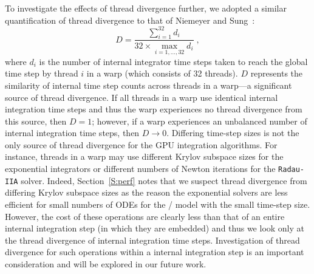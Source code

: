 \documentclass[preprint]{elsarticle}
\begin{document}
To investigate the effects of thread divergence further, we adopted a similar quantification of thread divergence to that of Niemeyer and Sung~\cite{Niemeyer:2014aa}:
\begin{equation}
	D = \frac{\sum_{i=1}^{32}{d_i}}{32 \times \max\limits_{i = 1, \dots, 32} d_i} \;,
	\label{eqn:divergence}
\end{equation}
where $d_i$ is the number of internal integrator time steps taken to reach the global time step by thread $i$ in a warp (which consists of 32 threads).
$D$ represents the similarity of internal time step counts across threads in a warp---a significant source of thread divergence.
If all threads in a warp use identical internal integration time steps and thus the warp experiences no thread divergence from this source, then $D = 1$; however, if a warp experiences an unbalanced number of internal integration time steps, then $D \to 0$.
Differing time-step sizes is not the only source of thread divergence for the GPU integration algorithms.
For instance, threads in a warp may use different Krylov subspace sizes for the exponential integrators or different numbers of Newton iterations for the \texttt{Radau-IIA} solver.
Indeed, Section~\ref{S:perf} notes that we suspect thread divergence from differing Krylov subspace sizes as the reason the exponential solvers are less efficient for small numbers of ODEs for the \slash{} model with the small time-step size.
However, the cost of these operations are clearly less than that of an entire internal integration step (in which they are embedded) and thus we look only at the thread divergence of internal integration time steps.
Investigation of thread divergence for such operations within a internal integration step is an important consideration and will be explored in our future work.
\end{document}
